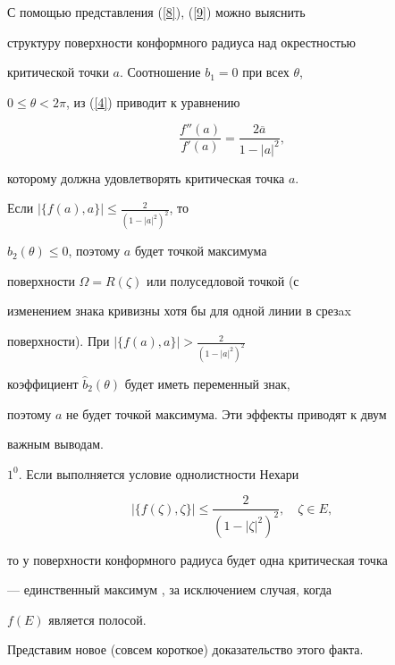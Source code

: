 С помощью представления (\ref{8}), (\ref{9}) можно выяснить


структуру поверхности конформного радиуса над окрестностью


критической точки $a$. Соотношение $b_1=0$ при всех $\theta$,


$0\leq\theta <2\pi$, из (\ref{4}) приводит к уравнению


\begin{equation}\label{10}


\frac{f''(a)}{f'(a)}=\frac{2\overline{a}}{1-|a|^2},


\end{equation}


которому должна удовлетворять критическая точка $a$.





Если $|\{f(a),a\}|\leq \frac{2}{(1-|a|^2)^2}$, то


$\widehat{b}_2(\theta)\leq 0$, поэтому $a$ будет точкой максимума


поверхности $\Omega=R(\zeta)$ или полуседловой точкой (с


изменением знака кривизны хотя бы для одной линии в срезax


поверхности). При $|\{f(a),a\}|> \frac{2}{(1-|a|^2)^2}$


коэффициент $\widehat{b}_2(\theta)$ будет иметь переменный знак,


поэтому $a$ не будет точкой максимума. Эти эффекты приводят к двум


важным выводам.


\medskip





$1^0$. Если выполняется условие однолистности Нехари \cite{6}


\begin{equation}\label{11}


|\{f(\zeta),\zeta\}|\leq \frac{2}{(1-|\zeta|^2)^2},\quad \zeta\in E,


\end{equation}


то у поверхности конформного радиуса будет одна критическая точка


--- единственный максимум \cite{5}, за исключением случая, когда


$f(E)$ является полосой.





Представим новое (совсем короткое) доказательство этого факта.


